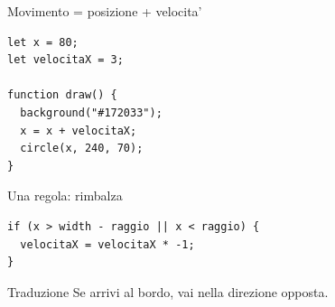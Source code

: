 \documentclass[aspectratio=169]{beamer}
\begin{document}
\begin{frame}[fragile]{Movimento = posizione + velocita'}
  \begin{lstlisting}[style=jsstyle]
let x = 80;
let velocitaX = 3;

function draw() {
  background("#172033");
  x = x + velocitaX;
  circle(x, 240, 70);
}
  \end{lstlisting}
  \vspace{0.25cm}
\end{frame}

\begin{frame}[fragile]{Una regola: rimbalza}
  \begin{lstlisting}[style=jsstyle]
if (x > width - raggio || x < raggio) {
  velocitaX = velocitaX * -1;
}
  \end{lstlisting}
  \vspace{0.15cm}
  \begin{block}{Traduzione}
    Se arrivi al bordo, vai nella direzione opposta.
  \end{block}
\end{frame}
\end{document}
